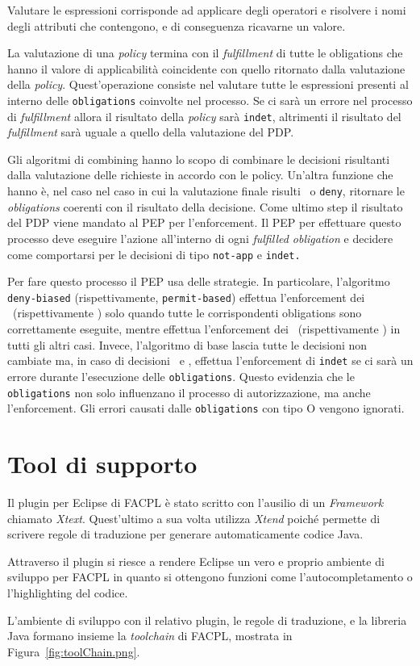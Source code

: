 Valutare le espressioni corrisponde ad applicare degli operatori e risolvere i nomi degli attributi che contengono, e di conseguenza ricavarne un valore. \par

La valutazione di una \textit{policy} termina con il \textit{fulfillment} di tutte le obligations  che hanno il valore di applicabilità coincidente con quello ritornato dalla valutazione della \textit{policy}. Quest'operazione consiste nel valutare tutte le espressioni presenti al interno delle \texttt{obligations} coinvolte nel processo. Se ci sarà un errore nel processo di \textit{fulfillment} allora il risultato della \textit{policy} sarà \texttt{indet}, altrimenti il risultato del \textit{fulfillment} sarà uguale a quello della valutazione del PDP. \par
Gli algoritmi di combining hanno lo scopo di combinare le decisioni risultanti dalla valutazione delle richieste in accordo con le policy. Un'altra funzione che hanno è, nel caso nel caso in cui la valutazione finale risulti \permit \ o \texttt{deny}, ritornare le \textit{obligations} coerenti con il risultato della decisione.  
Come ultimo step il risultato del \ac{PDP} viene mandato al \ac{PEP} per l'enforcement.
Il PEP per effettuare questo processo deve eseguire l'azione all'interno di ogni \textit{fulfilled obligation} e decidere come comportarsi per le decisioni di tipo \texttt{not-app} e \texttt{indet.} \par
Per fare questo processo il \ac{PEP} usa delle strategie. In particolare, l'algoritmo \texttt{deny-biased} (rispettivamente, \texttt{permit-based}) effettua l'enforcement dei \permit \ (rispettivamente \deny) solo quando tutte le corrispondenti obligations sono correttamente eseguite, mentre effettua l'enforcement dei \deny \  (rispettivamente \permit) in tutti gli altri casi. Invece, l'algoritmo di base lascia tutte le decisioni non cambiate ma, in caso di decisioni \permit \ e \deny, effettua l'enforcement di \texttt{indet} se ci sarà un errore durante l'esecuzione delle \texttt{obligations}. Questo evidenzia che le \texttt{obligations} non solo influenzano il processo di autorizzazione, ma anche l'enforcement. Gli errori causati dalle \texttt{obligations} con tipo O vengono ignorati.


\section{Tool di supporto}
\label{sec:tool}
Il plugin per Eclipse di \ac{FACPL} è stato scritto con l'ausilio di un \textit{Framework} chiamato \textit{Xtext}. Quest'ultimo a sua volta utilizza \textit{Xtend} poiché permette di scrivere regole di traduzione per generare automaticamente codice Java.\par
Attraverso il plugin si riesce a rendere Eclipse un vero e proprio ambiente di sviluppo per \ac{FACPL} in quanto si ottengono funzioni come l'autocompletamento o l'highlighting del codice.\par
L'ambiente di sviluppo con il relativo plugin, le regole di traduzione, e la libreria Java formano insieme la \textit{toolchain} di \ac{FACPL}, mostrata in Figura~\ref{fig:toolChain.png}.


